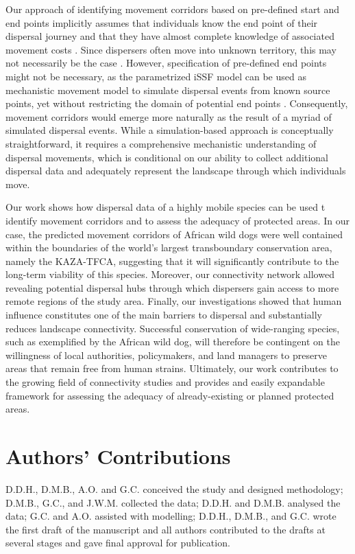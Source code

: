 \documentclass[abstract=on,10pt,a4paper,bibliography=totocnumbered]{article}
\begin{document}
Our approach of identifying movement corridors based on pre-defined start and
end points implicitly assumes that individuals know the end point of their
dispersal journey and that they have almost complete knowledge of associated
movement costs \citep{Panzacchi.2016}. Since dispersers often move into unknown
territory, this may not necessarily be the case \citep{Abrahms.2017,
Cozzi.2020}. However, specification of pre-defined end points might not be
necessary, as the parametrized iSSF model can be used as mechanistic movement
model to simulate dispersal events from known source points, yet without
restricting the domain of potential end points \citep{Signer.2017}.
Consequently, movement corridors would emerge more naturally as the result of a
myriad of simulated dispersal events. While a simulation-based approach is
conceptually straightforward, it requires a comprehensive mechanistic
understanding of dispersal movements, which is conditional on our ability to
collect additional dispersal data and adequately represent the landscape through
which individuals move.

Our work shows how dispersal data of a highly mobile species can be used t
identify movement corridors and to assess the adequacy of protected areas. In
our case, the predicted movement corridors of African wild dogs were well
contained within the boundaries of the world's largest transboundary
conservation area, namely the KAZA-TFCA, suggesting that it will significantly
contribute to the long-term viability of this species. Moreover, our
connectivity network allowed revealing potential dispersal hubs through which
dispersers gain access to more remote regions of the study area. Finally, our
investigations showed that human influence constitutes one of the main barriers
to dispersal and substantially reduces landscape connectivity. Successful
conservation of wide-ranging species, such as exemplified by the African wild
dog, will therefore be contingent on the willingness of local authorities,
policymakers, and land managers to preserve areas that remain free from human
strains. Ultimately, our work contributes to the growing field of connectivity
studies and provides and easily expandable framework for assessing the adequacy
of already-existing or planned protected areas.

\section{Authors' Contributions}
D.D.H., D.M.B., A.O. and G.C. conceived the study and designed methodology;
D.M.B., G.C., and J.W.M. collected the data; D.D.H. and D.M.B. analysed the
data; G.C. and A.O. assisted with modelling; D.D.H., D.M.B., and G.C. wrote the
first draft of the manuscript and all authors contributed to the drafts at
several stages and gave final approval for publication.
\end{document}
